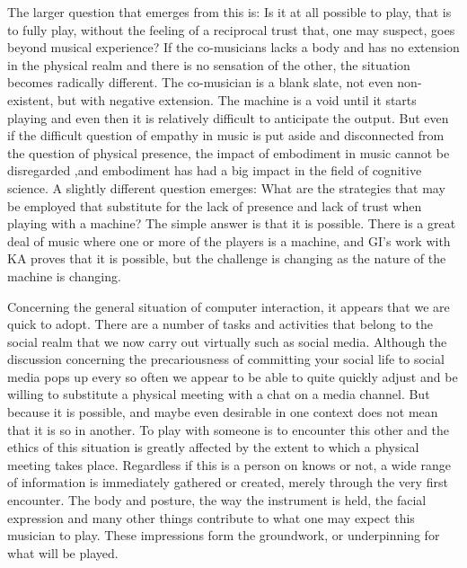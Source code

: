 \documentclass[11pt]{article}
\begin{document}
The larger question that emerges from this is: Is it at all possible
to play, that is to fully play, without the feeling of a reciprocal
trust that, one may suspect, goes beyond musical experience? If the
co-musicians lacks a body and has no extension in the physical realm
and there is no sensation of the other, the situation becomes
radically different. The co-musician is a blank slate, not even
non-existent, but with negative extension. The machine is a void until
it starts playing and even then it is relatively difficult to
anticipate the output. But even if the difficult question of empathy
in music is put aside and disconnected from the question of physical
presence, the impact of embodiment in music cannot be disregarded
\citep{godoy2006,Leman2015},and embodiment has had a big impact in the
field of cognitive science. A slightly different question emerges:
What are the strategies that may be employed that substitute for the
lack of presence and lack of trust when playing with a machine? The
simple answer is that it is possible. There is a great deal of music
where one or more of the players is a machine, and GI's work with KA
proves that it is possible, but the challenge is changing as the
nature of the machine is changing.

Concerning the general situation of computer interaction, it appears
that we are quick to adopt. There are a number of tasks and activities
that belong to the social realm that we now carry out virtually such
as social media. Although the discussion concerning the precariousness
of committing your social life to social media pops up every so often
\citep[see, for example, ][]{lanier2018,lanier96} we appear to be able
to quite quickly adjust and be willing to substitute a physical
meeting with a chat on a media channel. But because it is possible,
and maybe even desirable in one context does not mean that it is so in
another. To play with someone is to encounter this other and the
ethics of this situation is greatly affected by the extent to which a
physical meeting takes place. Regardless if this is a person on knows
or not, a wide range of information is immediately gathered or
created, merely through the very first encounter. The body and
posture, the way the instrument is held, the facial expression and
many other things contribute to what one may expect this musician to
play. These impressions form the groundwork, or underpinning for what
will be played.
\end{document}
